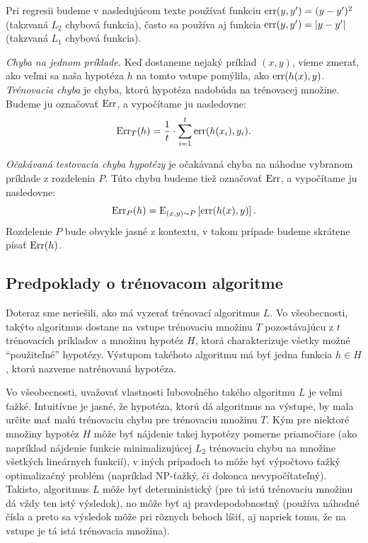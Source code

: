 
Pri regresii budeme v nasledujúcom texte používať funkciu
$\mathrm{err}(y,y')=(y-y')^2$ (takzvaná $L_2$ chybová funkcia), často sa používa
aj funkcia $\mathrm{err}(y,y')=|y-y'|$ (takzvaná $L_1$ chybová funkcia).

\emph{Chyba na jednom príklade.} Keď dostaneme nejaký príklad $(x, y)$,
vieme zmerať, ako veľmi sa naša hypotéza $h$ na tomto vstupe pomýlila,
ako $\mathrm{err}(h(x), y)$. \emph{Trénovacia chyba} je chyba,
ktorú hypotéza nadobúda na trénovacej množine. Budeme ju
označovať $\mathrm{Err}$, a vypočítame ju nasledovne:
$$\mathrm{Err}_T(h) = \frac{1}{t} \cdot \sum_{i=1}^t \mathrm{err}(h(x_i), y_i).$$

\emph{Očakávaná testovacia chyba hypotézy} je očakávaná chyba
na náhodne vybranom príklade z rozdelenia $P$.
Túto chybu budeme tiež označovať $\mathrm{Err}$,
a vypočítame ju nasledovne:
$$\mathrm{Err}_P(h) = \mathrm{E}_{(x, y)\sim P} \left[ \mathrm{err}(h(x), y) \right].$$
Rozdelenie $P$ bude obvykle jasné z kontextu, v takom prípade
budeme skrátene písať $\mathrm{Err}(h)$.

\subsection{Predpoklady o trénovacom algoritme}
\label{ch1:asses}

Doteraz sme neriešili, ako má vyzerať trénovací algoritmus $L$. Vo
všeobecnosti, takýto algoritmus dostane na vstupe trénovaciu množinu
$T$ pozostávajúcu z $t$ trénovacích príkladov a množinu hypotéz $H$,
ktorá charakterizuje všetky možné ``použiteľné'' hypotézy. Výstupom
takéhoto algoritmu má byť jedna funkcia $h\in H$, ktorú nazveme
natrénovaná hypotéza.

Vo všeobecnosti, uvažovať vlastnosti ľubovoľného takého algoritmu $L$
je veľmi ťažké. Intuitívne je jasné, že hypotéza, ktorú dá algoritmus
na výstupe, by mala určite mať malú trénovaciu chybu pre trénovaciu
množinu $T$. Kým pre niektoré množiny hypotéz $H$ môže byť nájdenie
takej hypotézy pomerne priamočiare (ako napríklad nájdenie funkcie
minimalizujúcej $L_2$ trénovaciu chybu na množine všetkých lineárnych
funkcií), v iných prípadoch to môže byť výpočtovo ťažký optimalizačný
problém (napríklad NP-ťažký, či dokonca nevypočítateľný). Takisto,
algoritmus $L$ môže byť deterministický (pre tú istú trénovaciu
množinu dá vždy ten istý výsledok), no môže byť aj pravdepodobnostný
(používa náhodné čísla a preto sa výsledok môže pri rôznych behoch
líšiť, aj napriek tomu, že na vstupe je tá istá trénovacia
množina).

